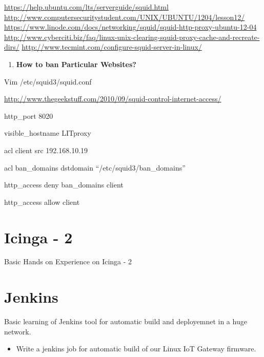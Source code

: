 \documentclass[letterpaper,10pt,english]{sphinxmanual}
\begin{document}
\href{https://help.ubuntu.com/lts/serverguide/squid.html}{https://help.ubuntu.com/lts/serverguide/squid.html}
\href{http://www.computersecuritystudent.com/UNIX/UBUNTU/1204/lesson12/}{http://www.computersecuritystudent.com/UNIX/UBUNTU/1204/lesson12/}
\href{https://www.linode.com/docs/networking/squid/squid-http-proxy-ubuntu-12-04}{https://www.linode.com/docs/networking/squid/squid-http-proxy-ubuntu-12-04}
\href{http://www.cyberciti.biz/faq/linux-unix-clearing-squid-proxy-cache-and-recreate-dirs/}{http://www.cyberciti.biz/faq/linux-unix-clearing-squid-proxy-cache-and-recreate-dirs/}
\href{http://www.tecmint.com/configure-squid-server-in-linux/}{http://www.tecmint.com/configure-squid-server-in-linux/}
\begin{enumerate}
\item {} 
\textbf{How to ban Particular Websites?}

\end{enumerate}

Vim /etc/squid3/squid.conf

\href{http://www.thegeekstuff.com/2010/09/squid-control-internet-access/}{http://www.thegeekstuff.com/2010/09/squid-control-internet-access/}

http\_port 8020

visible\_hostname LITproxy

acl client src 192.168.10.19

acl ban\_domains dstdomain ``/etc/squid3/ban\_domains''

http\_access deny ban\_domains client

http\_access allow client


\section{Icinga - 2}
\label{week-14:icinga-2}
Basic Hands on Experience on Icinga - 2


\section{Jenkins}
\label{week-14:jenkins}
Basic learning of Jenkins tool for automatic build and deployemnet in a huge network.
\begin{itemize}
\item {} 
Write a jenkins job for automatic build of our Linux IoT Gateway firmware.

\end{itemize}
\label{appendix:appendix}
\end{document}
